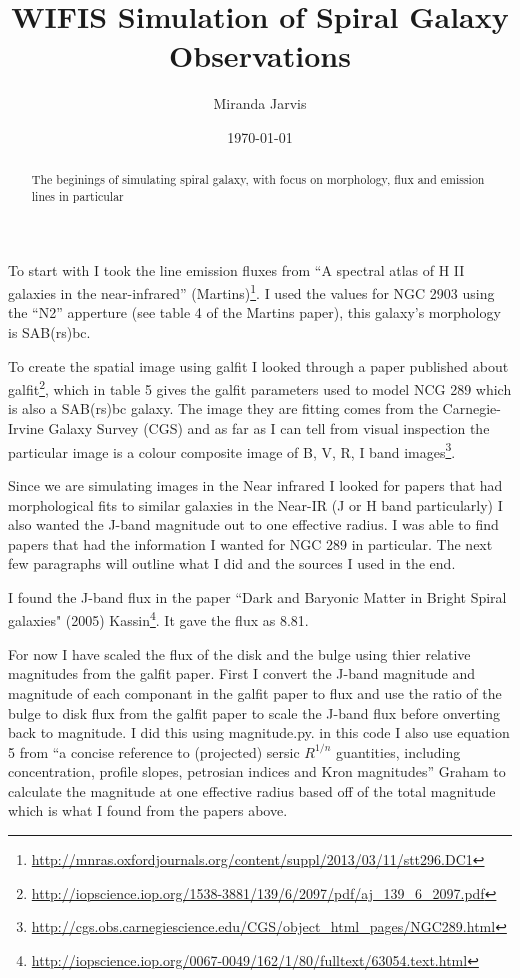 \documentclass[11pt,twoside]{article}
\title{WIFIS Simulation of Spiral Galaxy Observations}
\author{Miranda Jarvis}
\date{\today}
\begin{document}
\maketitle

\begin{abstract}
The beginings of simulating spiral galaxy, with focus on morphology, flux and emission lines in particular
\end{abstract}

To start with I took the line emission fluxes from ``A spectral atlas of H II galaxies in the near-infrared'' (Martins)\footnote{\url{http://mnras.oxfordjournals.org/content/suppl/2013/03/11/stt296.DC1}}. I used the values for NGC 2903 using the ``N2'' apperture (see table 4 of the Martins paper), this galaxy's morphology is SAB(rs)bc.

To create the spatial image using galfit I looked through a paper published about galfit\footnote{\url{http://iopscience.iop.org/1538-3881/139/6/2097/pdf/aj_139_6_2097.pdf}}, which in table 5 gives the galfit parameters used to model NCG 289 which is also a SAB(rs)bc galaxy. The image they are fitting comes from the Carnegie-Irvine Galaxy Survey (CGS) and as far as I can tell from visual inspection the particular image is a colour composite image of B, V, R, I band images\footnote{\url{http://cgs.obs.carnegiescience.edu/CGS/object_html_pages/NGC289.html}}.

Since we are simulating images in the Near infrared I looked for papers that had morphological fits to similar galaxies in the Near-IR (J or H band particularly) I also wanted the J-band magnitude out to one effective radius. I was able to find papers that had the information I wanted for NGC 289 in particular. The next few paragraphs will outline what I did and the sources I used in the end. 

I found the J-band flux in the paper ``Dark and Baryonic Matter in Bright Spiral galaxies" (2005) Kassin\footnote{\url{http://iopscience.iop.org/0067-0049/162/1/80/fulltext/63054.text.html}}. It gave the flux as 8.81.

For now I have scaled the flux of the disk and the bulge using thier relative magnitudes from the galfit paper. First I convert the J-band magnitude and magnitude of each componant in the galfit paper to flux and use the ratio of the bulge to disk flux from the galfit paper to scale the J-band flux before onverting back to magnitude. I did this using magnitude.py. in this code I also use equation 5 from ``a concise reference to (projected) sersic $R^{1/n}$ guantities, including concentration, profile slopes, petrosian indices and Kron magnitudes'' Graham to calculate the magnitude at one effective radius based off of the total magnitude which is what I found from the papers above.
\end{document}
